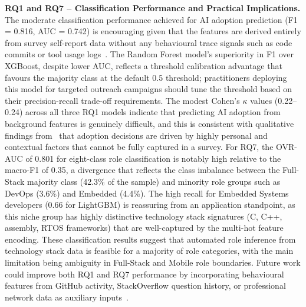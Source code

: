 \documentclass[journal, onecolumn]{IEEEtran}
\begin{document}
\textbf{RQ1 and RQ7 -- Classification Performance and Practical Implications.}
The moderate classification performance achieved for AI adoption prediction (F1 = 0.816, AUC = 0.742) is encouraging given that the features are derived entirely from survey self-report data without any behavioural trace signals such as code commits or tool usage logs~\cite{ziegler2022productivity}.
The Random Forest model's superiority in F1 over XGBoost, despite lower AUC, reflects a threshold calibration advantage that favours the majority class at the default 0.5 threshold; practitioners deploying this model for targeted outreach campaigns should tune the threshold based on their precision-recall trade-off requirements.
The modest Cohen's $\kappa$ values (0.22--0.24) across all three RQ1 models indicate that predicting AI adoption from background features is genuinely difficult, and this is consistent with qualitative findings from~\cite{vaithilingam2022expectation} that adoption decisions are driven by highly personal and contextual factors that cannot be fully captured in a survey.
For RQ7, the OVR-AUC of 0.801 for eight-class role classification is notably high relative to the macro-F1 of 0.35, a divergence that reflects the class imbalance between the Full-Stack majority class (42.3\% of the sample) and minority role groups such as DevOps (3.6\%) and Embedded (4.4\%).
The high recall for Embedded Systems developers (0.66 for LightGBM) is reassuring from an application standpoint, as this niche group has highly distinctive technology stack signatures (C, C++, assembly, RTOS frameworks) that are well-captured by the multi-hot feature encoding.
These classification results suggest that automated role inference from technology stack data is feasible for a majority of role categories, with the main limitation being ambiguity in Full-Stack and Mobile role boundaries.
Future work could improve both RQ1 and RQ7 performance by incorporating behavioural features from GitHub activity, StackOverflow question history, or professional network data as auxiliary inputs~\cite{bird2023taking}.
\end{document}
